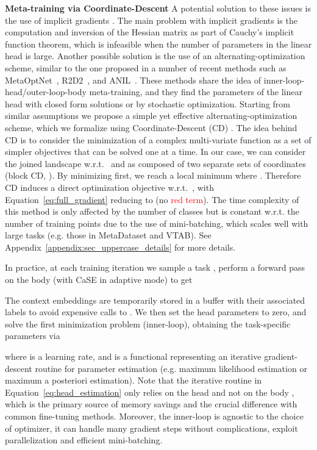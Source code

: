 \documentclass{article}
\begin{document}
\textbf{Meta-training via Coordinate-Descent}
A potential solution to these issues is the use of implicit gradients \citep{chen2020modular, rajeswaran2019meta, chen2022meta}. The main problem with implicit gradients is the computation and inversion of the Hessian matrix as part of Cauchy’s implicit function theorem, which is infeasible when the number of parameters in the linear head is large. Another possible solution is the use of an alternating-optimization scheme, similar to the one proposed in a number of recent methods such as MetaOptNet~\citep{lee2019meta}, R2D2~\citep{bertinetto2018meta}, and ANIL~\citep{raghu2019rapid}. These methods share the idea of inner-loop-head/outer-loop-body meta-training, 
and they find the parameters of the linear head with closed form solutions or by stochastic optimization.
Starting from similar assumptions we propose a simple yet effective alternating-optimization scheme, which we formalize using Coordinate-Descent (CD) \citep{wright2015coordinate}. The idea behind CD is to consider the minimization of a complex multi-variate function as a set of simpler objectives that can be solved one at a time. In our case, we can consider the joined landscape w.r.t.~ and  as composed of two separate sets of coordinates (block CD, \citealt{wright2015coordinate}).
By minimizing  first, we reach a local minimum where . Therefore CD induces a direct optimization objective w.r.t.~, with Equation~\eqref{eq:full_gradient} reducing to  (no \textcolor{red}{red term}).
The time complexity of this method is only affected by the number of classes but is constant w.r.t. the number of training points due to the use of mini-batching, which scales well with large tasks (e.g. those in MetaDataset and VTAB). See Appendix~\ref{appendix:sec_uppercase_details} for more details.

In practice, at each training iteration we sample a task , perform a forward pass on the body (with CaSE in adaptive mode) to get

The context embeddings are temporarily stored in a buffer with their associated labels  to avoid expensive calls to . We then set the head parameters to zero, and solve the first minimization problem (inner-loop), obtaining the task-specific parameters  via

where  is a learning rate, and  is a functional representing an iterative gradient-descent routine for parameter estimation (e.g. maximum likelihood estimation or maximum a posteriori estimation). Note that the iterative routine in Equation~\eqref{eq:head_estimation} only relies on the head  and not on the body , which is the primary source of memory savings and the crucial difference with common fine-tuning methods. Moreover, the inner-loop is agnostic to the choice of optimizer, it can handle many gradient steps without complications, exploit parallelization and efficient mini-batching.
\end{document}
